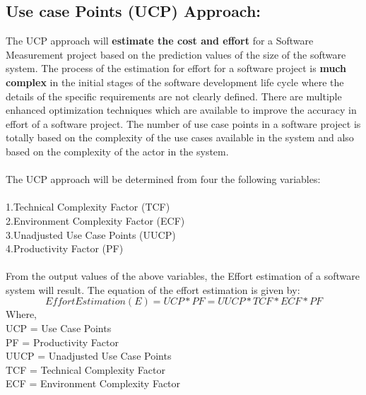 \documentclass[a4paper, 11pt]{article}
\begin{document}
\subsection{Use case Points (UCP) Approach:}
The UCP approach will \textbf{estimate the cost and effort} for a Software Measurement project based on the prediction values of the size of the software system.\cite{3} The process of the estimation for effort for a software project is \textbf{much complex} in the initial stages of the software development life cycle where the details of the specific requirements are not clearly defined. There are multiple enhanced optimization techniques which are available to improve the accuracy in effort of a software project. The number of use case points in a software project is totally based on the complexity of the use cases available in the system and also based on the complexity of the actor in the system.\\ \\
The UCP approach will be determined from four the following variables:\\ \\
1.Technical Complexity Factor (TCF)\\
2.Environment Complexity Factor (ECF)\\
3.Unadjusted Use Case Points (UUCP)\\
4.Productivity Factor (PF)\\ \\
From the output values of the above variables, the Effort estimation of a software system will result. The equation of the effort estimation is given by:\\
\begin{equation}
Effort Estimation (E) = UCP * PF = UUCP * TCF * ECF * PF 
\end{equation}
Where, \\
UCP = Use Case Points \\
PF = Productivity Factor \\
UUCP = Unadjusted Use Case Points \\
TCF = Technical Complexity Factor \\
ECF = Environment Complexity Factor \\
\end{document}
